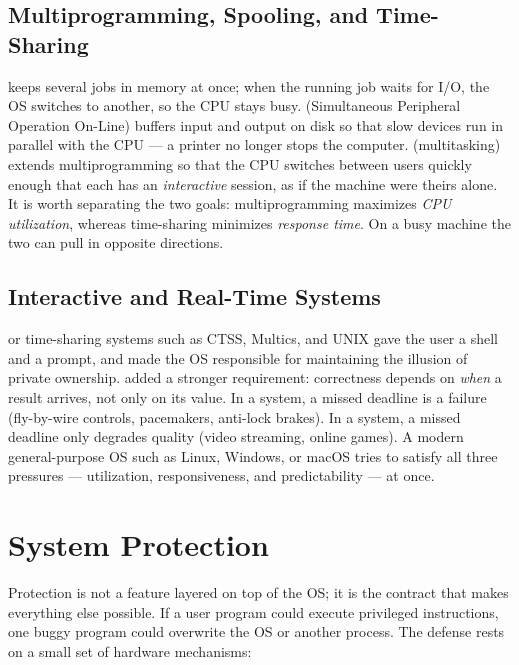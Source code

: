 \documentclass[11pt]{article}
\begin{document}
\subsection{Multiprogramming, Spooling, and Time-Sharing}

 keeps several jobs in memory at once; when the running job waits for I/O, the OS switches to another, so the CPU stays busy.  (Simultaneous Peripheral Operation On-Line) buffers input and output on disk so that slow devices run in parallel with the CPU --- a printer no longer stops the computer.  (multitasking) extends multiprogramming so that the CPU switches between users quickly enough that each has an \emph{interactive} session, as if the machine were theirs alone. It is worth separating the two goals: multiprogramming maximizes \emph{CPU utilization}, whereas time-sharing minimizes \emph{response time}. On a busy machine the two can pull in opposite directions.

\subsection{Interactive and Real-Time Systems}

 or time-sharing systems such as CTSS, Multics, and UNIX gave the user a shell and a prompt, and made the OS responsible for maintaining the illusion of private ownership.  added a stronger requirement: correctness depends on \emph{when} a result arrives, not only on its value. In a  system, a missed deadline is a failure (fly-by-wire controls, pacemakers, anti-lock brakes). In a  system, a missed deadline only degrades quality (video streaming, online games). A modern general-purpose OS such as Linux, Windows, or macOS tries to satisfy all three pressures --- utilization, responsiveness, and predictability --- at once.

\section{System Protection}

Protection is not a feature layered on top of the OS; it is the contract that makes everything else possible. If a user program could execute privileged instructions, one buggy program could overwrite the OS or another process. The defense rests on a small set of hardware mechanisms:
\end{document}
